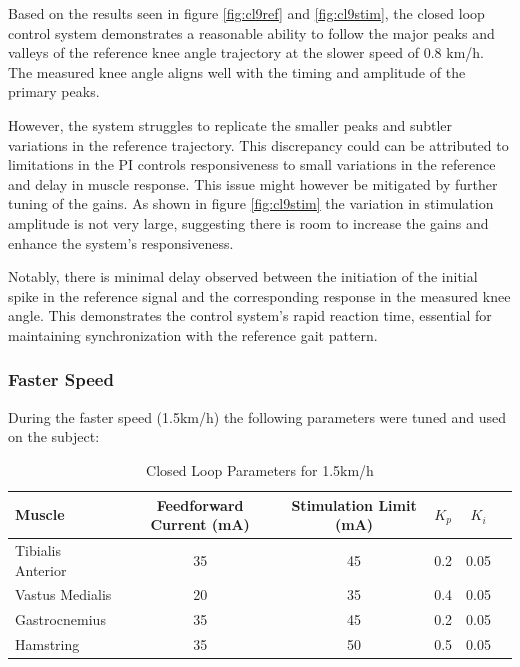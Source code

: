 Based on the results seen in figure \ref{fig:cl9ref} and \ref{fig:cl9stim}, the closed loop control system demonstrates a reasonable ability to follow the major peaks and valleys of the reference knee angle trajectory at the slower speed of 0.8 km/h. The measured knee angle aligns well with the timing and amplitude of the primary peaks. 

However, the system struggles to replicate the smaller peaks and subtler variations in the reference trajectory. This discrepancy could can be attributed to limitations in the PI controls responsiveness to small variations in the reference and delay in muscle response. This issue might however be mitigated by further tuning of the gains. As shown in figure \ref{fig:cl9stim} the variation in stimulation amplitude is not very large, suggesting there is room to increase the gains and enhance the system's responsiveness.

Notably, there is minimal delay observed between the initiation of the initial spike in the reference signal and the corresponding response in the measured knee angle. This demonstrates the control system's rapid reaction time, essential for maintaining synchronization with the reference gait pattern.



\subsubsection{Faster Speed}
During the faster speed (1.5km/h) the following parameters were tuned and used on the subject:

\begin{table}[h!]
\centering
\caption{Closed Loop Parameters for 1.5km/h}
\begin{tabular}{|l|c|c|c|c|c|}
\hline
\textbf{Muscle}  & \textbf{Feedforward Current (mA)} & \textbf{Stimulation Limit (mA)} & \textbf{$K_p$} & \textbf{$K_i$} \\ \hline
Tibialis Anterior & 35 & 45 & 0.2 & 0.05 \\ \hline
Vastus Medialis   & 20 & 35 & 0.4 & 0.05 \\ \hline
Gastrocnemius     & 35 & 45 & 0.2 & 0.05 \\ \hline
Hamstring          & 35 & 50 & 0.5 & 0.05 \\ \hline
\end{tabular}
\label{tab:closed_loop_12}
\end{table}

